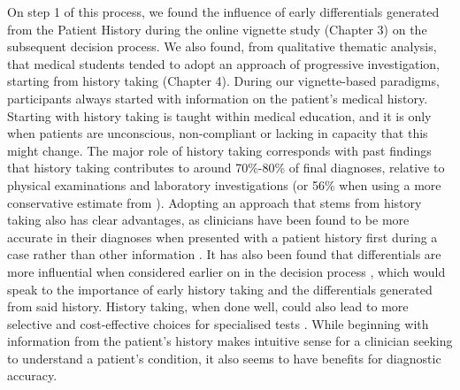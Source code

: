 \documentclass[a4paper, nobind]{templates/ociamthesis}
\begin{document}
On step 1 of this process, we found the influence of early differentials generated from the Patient History during the online vignette study (Chapter 3) on the subsequent decision process. We also found, from qualitative thematic analysis, that medical students tended to adopt an approach of progressive investigation, starting from history taking (Chapter 4). During our vignette-based paradigms, participants always started with information on the patient's medical history. Starting with history taking is taught within medical education, and it is only when patients are unconscious, non-compliant or lacking in capacity that this might change. The major role of history taking corresponds with past findings that history taking contributes to around 70\%-80\% of final diagnoses, relative to physical examinations and laboratory investigations \autocite{hampton_relative_1975,peterson_contributions_1992,tsukamoto_contribution_2012} (or 56\% when using a more conservative estimate from \textcite{sandler_importance_1980}). Adopting an approach that stems from history taking also has clear advantages, as clinicians have been found to be more accurate in their diagnoses when presented with a patient history first during a case rather than other information \autocite{tio_effect_2022}. It has also been found that differentials are more influential when considered earlier on in the decision process \autocite{kourtidis_influences_2022}, which would speak to the importance of early history taking and the differentials generated from said history. History taking, when done well, could also lead to more selective and cost-effective choices for specialised tests \autocite{muhrer_importance_2014}. While beginning with information from the patient's history makes intuitive sense for a clinician seeking to understand a patient's condition, it also seems to have benefits for diagnostic accuracy.\\
\end{document}

